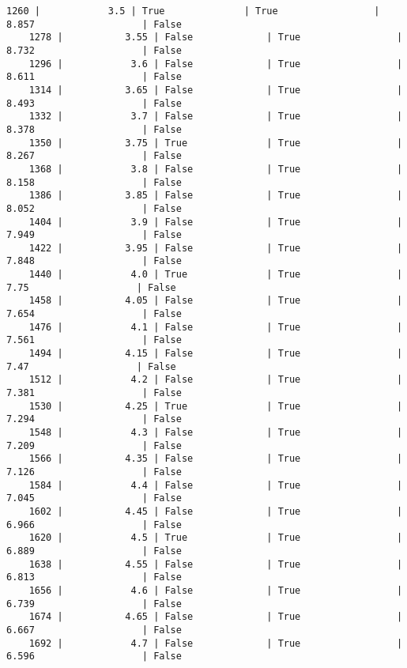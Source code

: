 \documentclass{article}
\begin{document}
\begin{Verbatim}[commandchars=\\\{\}]
    1260 |            3.5 | True              | True                 |   8.857                   | False
    1278 |           3.55 | False             | True                 |   8.732                   | False
    1296 |            3.6 | False             | True                 |   8.611                   | False
    1314 |           3.65 | False             | True                 |   8.493                   | False
    1332 |            3.7 | False             | True                 |   8.378                   | False
    1350 |           3.75 | True              | True                 |   8.267                   | False
    1368 |            3.8 | False             | True                 |   8.158                   | False
    1386 |           3.85 | False             | True                 |   8.052                   | False
    1404 |            3.9 | False             | True                 |   7.949                   | False
    1422 |           3.95 | False             | True                 |   7.848                   | False
    1440 |            4.0 | True              | True                 |    7.75                   | False
    1458 |           4.05 | False             | True                 |   7.654                   | False
    1476 |            4.1 | False             | True                 |   7.561                   | False
    1494 |           4.15 | False             | True                 |    7.47                   | False
    1512 |            4.2 | False             | True                 |   7.381                   | False
    1530 |           4.25 | True              | True                 |   7.294                   | False
    1548 |            4.3 | False             | True                 |   7.209                   | False
    1566 |           4.35 | False             | True                 |   7.126                   | False
    1584 |            4.4 | False             | True                 |   7.045                   | False
    1602 |           4.45 | False             | True                 |   6.966                   | False
    1620 |            4.5 | True              | True                 |   6.889                   | False
    1638 |           4.55 | False             | True                 |   6.813                   | False
    1656 |            4.6 | False             | True                 |   6.739                   | False
    1674 |           4.65 | False             | True                 |   6.667                   | False
    1692 |            4.7 | False             | True                 |   6.596                   | False

\end{Verbatim}
\end{document}
